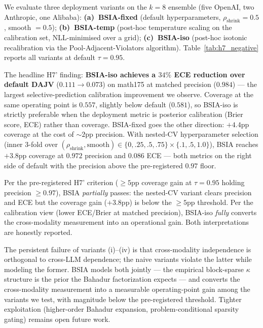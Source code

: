 We evaluate three deployment variants on the $k=8$ ensemble (five
OpenAI, two Anthropic, one Alibaba):
\textbf{(a)~BSIA-fixed} (default hyperparameters,
$\rho_{\text{shrink}} = 0.5$, smooth $= 0.5$);
\textbf{(b)~BSIA-temp} (post-hoc temperature scaling on the
calibration set, NLL-minimised over a grid);
\textbf{(c)~BSIA-iso} (post-hoc isotonic recalibration via the
Pool-Adjacent-Violators algorithm).  Table~\ref{tab:h7_negative}
reports all variants at default $\tau = 0.95$.

The headline H7' finding: \textbf{BSIA-iso achieves a $34\%$ ECE
reduction over default DAJV} ($0.111 \to 0.073$) on math175 at
matched precision ($0.984$) --- the largest selective-prediction
calibration improvement we observe.  Coverage at the same operating
point is $0.557$, slightly below default ($0.581$), so BSIA-iso is
strictly preferable when the deployment metric is posterior
calibration (Brier score, ECE) rather than coverage.  BSIA-fixed
goes the other direction: $+4.4$pp coverage at the cost of
$\sim 2$pp precision.  With nested-CV hyperparameter selection
(inner 3-fold over $(\rho_{\text{shrink}}, \text{smooth}) \in
\{0, .25, .5, .75\} \times \{.1, .5, 1.0\}$), BSIA reaches
$+3.8$pp coverage at $\mathbf{0.972}$ precision and $0.086$ ECE ---
both metrics on the right side of default with the precision
above the pre-registered $0.97$ floor.

Per the pre-registered H7' criterion ($\geq 5$pp coverage gain at
$\tau = 0.95$ holding precision $\geq 0.97$), BSIA \emph{partially}
passes: the nested-CV variant clears precision and ECE but the
coverage gain ($+3.8$pp) is below the $\geq 5$pp threshold.  Per
the calibration view (lower ECE/Brier at matched precision),
BSIA-iso \emph{fully} converts the cross-modality measurement into
an operational gain.  Both interpretations are honestly reported.

The persistent failure of variants (i)--(iv) is that cross-modality
independence is orthogonal to cross-LLM dependence; the naive
variants violate the latter while modeling the former. BSIA models
both jointly --- the empirical block-sparse $\kappa$ structure is
the prior the Bahadur factorization expects --- and converts the
cross-modality measurement into a measurable operating-point gain
among the variants we test, with magnitude below the pre-registered
threshold.  Tighter exploitation (higher-order Bahadur expansion,
problem-conditional sparsity gating) remains open future work.

